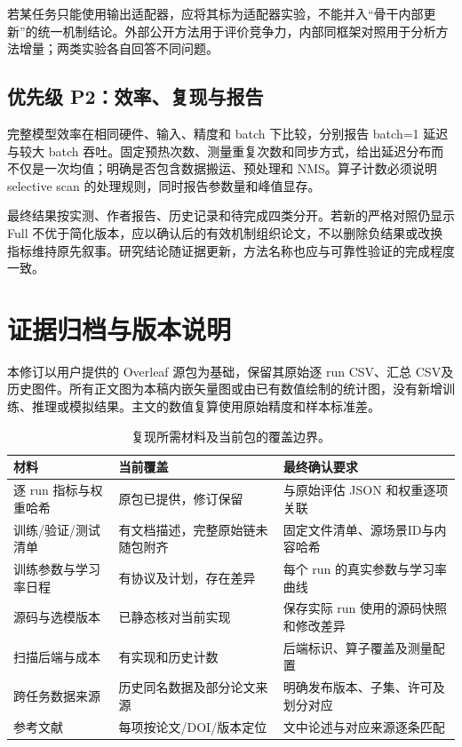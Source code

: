 \documentclass[UTF8,11pt,a4paper,fontset=fandol]{ctexart}
\begin{document}
若某任务只能使用输出适配器，应将其标为适配器实验，不能并入“骨干内部更新”的统一机制结论。外部公开方法用于评价竞争力，内部同框架对照用于分析方法增量；两类实验各自回答不同问题。

\subsection{优先级 P2：效率、复现与报告}
完整模型效率在相同硬件、输入、精度和 batch 下比较，分别报告 batch=1 延迟与较大 batch 吞吐。固定预热次数、测量重复次数和同步方式，给出延迟分布而不仅是一次均值；明确是否包含数据搬运、预处理和 NMS。算子计数必须说明 selective scan 的处理规则，同时报告参数量和峰值显存。

最终结果按实测、作者报告、历史记录和待完成四类分开。若新的严格对照仍显示 Full 不优于简化版本，应以确认后的有效机制组织论文，不以删除负结果或改换指标维持原先叙事。研究结论随证据更新，方法名称也应与可靠性验证的完成程度一致。

\section{证据归档与版本说明}\label{app:provenance}
本修订以用户提供的 Overleaf 源包为基础，保留其原始逐 run CSV、汇总 CSV及历史图件。所有正文图为本稿内嵌矢量图或由已有数值绘制的统计图，没有新增训练、推理或模拟结果。主文的数值复算使用原始精度和样本标准差。

\begin{table}[H]\centering\small
\caption{复现所需材料及当前包的覆盖边界。}
\begin{tabularx}{\linewidth}{P{3.8cm}YY}
\toprule
材料 & 当前覆盖 & 最终确认要求\\
\midrule
逐 run 指标与权重哈希 & 原包已提供，修订保留 & 与原始评估 JSON 和权重逐项关联\\
训练/验证/测试清单 & 有文档描述，完整原始链未随包附齐 & 固定文件清单、源场景ID与内容哈希\\
训练参数与学习率日程 & 有协议及计划，存在差异 & 每个 run 的真实参数与学习率曲线\\
源码与选模版本 & 已静态核对当前实现 & 保存实际 run 使用的源码快照和修改差异\\
扫描后端与成本 & 有实现和历史计数 & 后端标识、算子覆盖及测量配置\\
跨任务数据来源 & 历史同名数据及部分论文来源 & 明确发布版本、子集、许可及划分对应\\
参考文献 & 每项按论文/DOI/版本定位 & 文中论述与对应来源逐条匹配\\
\bottomrule
\end{tabularx}
\end{table}
\end{document}
